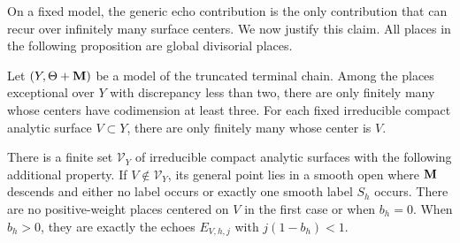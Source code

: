 On a fixed model, the generic echo contribution is the only contribution
that can recur over infinitely many surface centers.  We now justify this
claim.  All places in the following proposition are
global divisorial places.

\begin{proposition}
\label{prop:difficulty-finite}
Let \((Y,\Theta+\mathbf{M})\) be a model of the truncated terminal chain.
Among the places exceptional over \(Y\) with discrepancy less than two,
there are only finitely many whose centers have codimension at least three.
For each fixed irreducible compact analytic surface \(V\subset Y\), there
are only finitely many whose center is \(V\).

There is a finite set \(\mathcal V_Y\) of irreducible compact analytic
surfaces with the following additional property.  If
\(V\notin\mathcal V_Y\), its general point lies in a smooth open where
\(\mathbf{M}\) descends and either no label occurs or exactly one smooth label
\(S_h\) occurs.  There are no positive-weight places centered on \(V\)
in the first case or when \(b_h=0\).  When \(b_h>0\), they are exactly the
echoes \(E_{V,h,j}\) with \(j(1-b_h)<1\).
\end{proposition}

